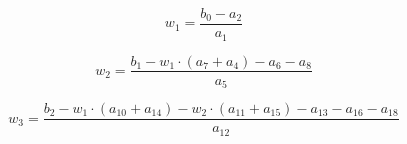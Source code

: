 \documentclass[a4paper]{article}
\begin{document}
\begin{equation}
w_{1} = \frac{b_{0}-a_{2}}{a_{1}}
\end{equation}

\begin{equation}
w_{2} = \frac{b_{1} - w_{1} \cdot (a_{7} + a_{4}) - a_{6} - a_{8}}{a_{5}}
\end{equation}

\begin{equation}
w_{3} = \frac{b_{2} - w_{1} \cdot (a_{10} + a_{14})
- w_{2} \cdot (a_{11} + a_{15})
- a_{13} - a_{16} - a_{18}}{a_{12}}
\end{equation}
\end{document}
